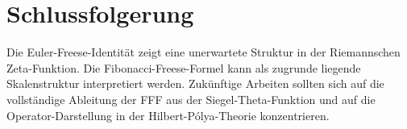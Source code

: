 \documentclass{article}
\begin{document}
\section{Schlussfolgerung}
Die Euler-Freese-Identität zeigt eine unerwartete Struktur in der Riemannschen Zeta-Funktion. Die Fibonacci-Freese-Formel kann als zugrunde liegende Skalenstruktur interpretiert werden. Zukünftige Arbeiten sollten sich auf die vollständige Ableitung der FFF aus der Siegel-Theta-Funktion und auf die Operator-Darstellung in der Hilbert-Pólya-Theorie konzentrieren.
\end{document}
